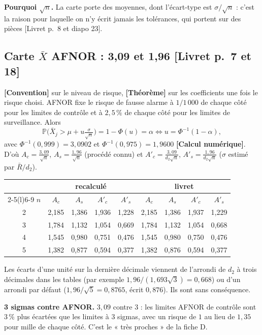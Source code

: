 \documentclass[11pt,a4paper]{article}
\theoremstyle{tq}
\theoremstyle{remark}
\newcommand{\thm}{\textcolor{vertTQ}{\textbf{[Théorème]}}}
\newcommand{\conv}{\textcolor{orangeTQ}{\textbf{[Convention]}}}
\newcommand{\num}{\textcolor{uimmblue}{\textbf{[Calcul numérique]}}}
\newcommand{\liv}[1]{\textcolor{uimmblue}{\small[Livret p.~#1]}}
\renewcommand{\P}{\mathbb{P}}
\newcommand{\Xb}{\bar{X}}
\newcommand{\Rb}{\bar{R}}
\begin{document}
\textbf{Pourquoi $\sqrt n$.} La carte porte des moyennes, dont l'écart-type est $\sigma/\sqrt n$ : c'est la raison pour laquelle on n'y écrit jamais les tolérances, qui portent sur des pièces \liv{8 et diapo 23}.

\subsection{Carte $\bar X$ AFNOR : 3,09 et 1,96 \liv{7 et 18}}
\conv{} sur le niveau de risque, \thm{} sur les coefficients une fois le risque choisi. AFNOR fixe le risque de fausse alarme à $1/1\,000$ de chaque côté pour les limites de contrôle et à $2{,}5\,\%$ de chaque côté pour les limites de surveillance. Alors
\[
\P\Big(\Xb_j>\mu+u\tfrac{\sigma}{\sqrt n}\Big)=1-\Phi(u)=\alpha\iff u=\Phi^{-1}(1-\alpha),
\]
avec $\Phi^{-1}(0{,}999)=3{,}0902$ et $\Phi^{-1}(0{,}975)=1{,}9600$ \num{}. D'où $A_c=\frac{3{,}09}{\sqrt n}$, $A_s=\frac{1{,}96}{\sqrt n}$ (procédé connu) et $A'_c=\frac{3{,}09}{d_2\sqrt n}$, $A'_s=\frac{1{,}96}{d_2\sqrt n}$ ($\sigma$ estimé par $\Rb/d_2$).

\begin{center}\small
\begin{tabular}{@{}c cccc cccc@{}}
\toprule
& \multicolumn{4}{c}{recalculé} & \multicolumn{4}{c}{livret}\\
\cmidrule(lr){2-5}\cmidrule(l){6-9}
$n$ & $A_c$ & $A_s$ & $A'_c$ & $A'_s$ & $A_c$ & $A_s$ & $A'_c$ & $A'_s$\\
\midrule
2 & 2,185 & 1,386 & 1,936 & 1,228 & 2,185 & 1,386 & 1,937 & 1,229\\
3 & 1,784 & 1,132 & 1,054 & 0,669 & 1,784 & 1,132 & 1,054 & 0,668\\
4 & 1,545 & 0,980 & 0,751 & 0,476 & 1,545 & 0,980 & 0,750 & 0,476\\
5 & 1,382 & 0,877 & 0,594 & 0,377 & 1,382 & 0,876 & 0,594 & 0,377\\
\bottomrule
\end{tabular}
\end{center}
Les écarts d'une unité sur la dernière décimale viennent de l'arrondi de $d_2$ à trois décimales dans les tables (par exemple $1{,}96/(1{,}693\sqrt3)=0{,}668$) ou d'un arrondi par défaut ($1{,}96/\sqrt5=0{,}8765$, écrit $0{,}876$). Ils sont sans conséquence.

\textbf{3 sigmas contre AFNOR.} $3{,}09$ contre $3$ : les limites AFNOR de contrôle sont $3\,\%$ plus écartées que les limites à 3 sigmas, avec un risque de $1$ au lieu de $1{,}35$ pour mille de chaque côté. C'est le « très proches » de la fiche D.
\end{document}
